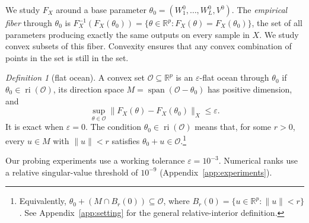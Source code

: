 \documentclass[twoside]{article}
\theoremstyle{remark}
\DeclareMathOperator{\spanop}{span}
\DeclareMathOperator{\ri}{ri}
\newcommand{\R}{\mathbb R}
\theoremstyle{highlightdefinition}
\newtheorem{maindefinition}[theorem]{Definition}
\theoremstyle{remark}
\newcommand{\spn}{\spanop}
\begin{document}
We study $F_X$ around a base parameter $\theta_0=(W_1^0,\ldots,W_L^0,V^0)$.
The \emph{empirical fiber} through $\theta_0$ is $F_X^{-1}(F_X(\theta_0))=\{\theta\in\R^p:F_X(\theta)=F_X(\theta_0)\}$, the set of all parameters producing exactly the same outputs on every sample in $X$.
We study convex subsets of this fiber. Convexity ensures that any convex combination of points in the set is still in the set.

\begin{maindefinition}[flat ocean]
A convex set $\mathcal O\subseteq\R^p$ is an $\varepsilon$-flat ocean through $\theta_0$ if $\theta_0\in\ri(\mathcal O)$, its direction space $M=\spn(\mathcal O-\theta_0)$ has positive dimension, and
\[
 \sup_{\theta\in\mathcal O}\|F_X(\theta)-F_X(\theta_0)\|_X\le\varepsilon.
\]
It is exact when $\varepsilon=0$. The condition $\theta_0\in\ri(\mathcal O)$ means that, for some $r>0$, every $u\in M$ with $\|u\|<r$ satisfies $\theta_0+u\in\mathcal O$.\footnote{Equivalently, $\theta_0+(M\cap B_r(0))\subseteq\mathcal O$, where $B_r(0)=\{u\in\R^p:\|u\|<r\}$. See Appendix~\ref{app:setting} for the general relative-interior definition.}
\end{maindefinition}

Our probing experiments use a working tolerance $\varepsilon=10^{-3}$. Numerical ranks use a relative singular-value threshold of $10^{-9}$ (Appendix~\ref{app:experiments}).



\begin{figure}[!t]
\end{figure}
\end{document}
